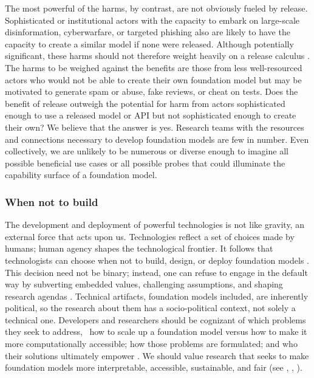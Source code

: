 The most powerful of the harms, by contrast, are not obviously fueled by release.   
Sophisticated or institutional actors with the capacity to embark on large-scale disinformation, cyberwarfare, or targeted phishing also are likely to have the capacity to create a similar model if none were released.  
Although potentially significant, these harms should not therefore weight heavily on a release calculus \citep{solaiman_release_2019, shevlane_offense-defense_2020}.  
The harms to be weighed against the benefits are those from less well-resourced actors who would not be able to create their own foundation model but may be motivated to generate spam or abuse, fake reviews, or cheat on tests.
Does the benefit of release outweigh the potential for harm from actors sophisticated enough to use a released model or API but not sophisticated enough to create their own? We believe that the answer is yes. 
Research teams with the resources and connections necessary to develop foundation models are few in number.  Even collectively, we are unlikely to be numerous or diverse enough to imagine all possible beneficial use cases or all possible probes that could illuminate the capability surface of a foundation model.

\subsubsection{When not to build} 
\label{sec:ethics-nottobuild}

The development and deployment of powerful technologies is not like gravity, an external force that acts upon us.
Technologies reflect a set of choices made by humans; human agency shapes the technological frontier.
It follows that technologists can choose when not to build, design, or deploy foundation models \citep{zimmermann_stop_2021}. 
This decision need not be binary; instead, one can refuse to engage in the default way by subverting embedded values, challenging assumptions, and shaping research agendas \citep{audra_simpson}. 
Technical artifacts, foundation models included, are inherently political, so the research about them has a socio-political context, not solely a technical one. Developers and researchers should be cognizant of which problems they seek to address, \eg~how to scale up a foundation model versus how to make it more computationally accessible; how those problems are formulated; and who their solutions ultimately empower \citep{rogaway_moral_nodate, winner_artifacts_1980, Passi2019}. We should value research that seeks to make foundation models more interpretable, accessible, sustainable, and fair (see , , ). 


